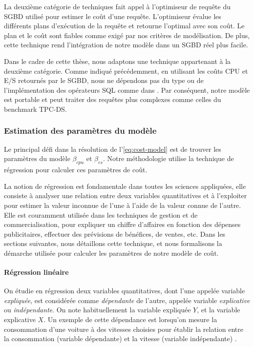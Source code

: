 La deuxième catégorie de techniques \cite{Bruno11, Chaudhuri97, Chaudhuri98} fait appel à l'optimiseur de requête du SGBD utilisé pour estimer le coût d'une requête. L'optimiseur évalue les différents plans d'exécution de la requête et retourne l'optimal avec son coût. Le plan et le coût sont fiables comme exigé par nos critères de modélisation. De plus, cette technique rend l'intégration de notre modèle dans un SGBD réel plus facile.

Dans le cadre de cette thèse, nous adaptons une technique appartenant à la deuxième catégorie. Comme indiqué précédemment, en utilisant les coûts CPU et E/S retournés par le SGBD, nous ne dépendons pas du type ou de l'implémentation des opérateurs SQL comme dans \cite{Xu13}. Par conséquent, notre modèle est portable et peut traiter des requêtes plus complexes comme celles du benchmark TPC-DS.

\subsubsection{Estimation des paramètres du modèle}
Le principal défi dans la résolution de l'\ref{eq:cost-model} est de trouver les paramètres du modèle $\beta_{cpu}$ et $\beta_{es}$. Notre méthodologie utilise la technique de régression pour calculer ces paramètres de coût.

La notion de régression est fondamentale dans toutes les sciences appliquées, elle consiste à analyser une relation entre deux variables quantitatives et à l'exploiter pour estimer la valeur inconnue de l'une à l'aide de la valeur connue de l'autre. Elle est couramment utilisée dans les techniques de gestion et de commercialisation, pour expliquer un chiffre d'affaires en fonction des dépenses publicitaires, effectuer des prévisions de bénéfices, de ventes, etc. Dans les sections suivantes, nous détaillons cette technique, et nous formalisons la démarche utilisée pour calculer les paramètres de notre modèle de coût.

\paragraph{Régression linéaire}
On étudie en régression deux variables quantitatives, dont l'une appelée variable \textit{expliquée}, est considérée comme \textit{dépendante} de l'autre, appelée variable \textit{explicative} ou \textit{indépendante}. On note habituellement la variable expliquée $Y$, et la variable explicative $X$. Un exemple de cette dépendance est lorsqu'on mesure la consommation d'une voiture à des vitesses choisies pour établir la relation entre la consommation (variable dépendante) et la vitesse (variable indépendante) \cite{Montgomery12, Neter96, Kutner04}.

